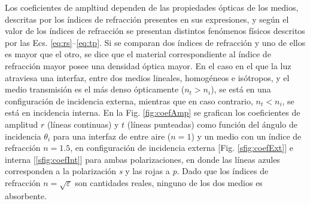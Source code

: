 Los coeficientes  de ampltiud dependen de las propiedades ópticas de los medios, descritas por los índices de refracción presentes en sus expresiones, y según el valor de los índices de refracción se presentan distintos fenómenos físicos descritos por las Ecs. \eqref{eq:rs}--\eqref{eq:tp}. Si se comparan dos índices de refracción y uno de ellos es mayor que el otro, se dice que el material correspondiente al índice de refracción mayor posee una densidad óptica mayor. En el caso en el que la luz atraviesa una interfaz, entre dos medios lineales, homogéneos e isótropos, y el medio transmisión es  el más denso ópticamente ($n_t>n_i$), se está en una configuración de incidencia externa, mientras que en caso contrario, $n_t<n_i$, se está en  incidencia interna. En la Fig. \ref{fig:coefAmp} se grafican los coeficientes de amplitud $r$ (líneas continuas) y $t$ (líneas punteadas) como función del ángulo de incidencia $\theta_i$ para una interfaz de entre aire ($n= 1$) y un medio con un índice de refracción $n = 1.5$, en configuración de incidencia externa [Fig. \ref{sfig:coefExt}] e interna [\ref{sfig:coefInt}] para ambas polarizaciones, en donde las líneas azules corresponden a la polarización \emph{s} y las rojas a \emph{p}. Dado que los índices de refracción $n = \sqrt{\varepsilon}$ son cantidades reales, ninguno de los dos medios es absorbente.
%
